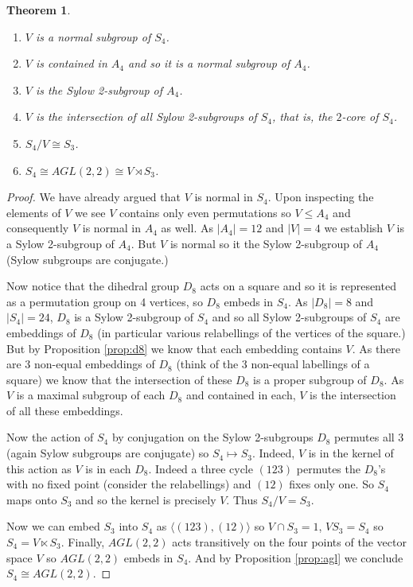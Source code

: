 \documentclass[12pt]{article}
\newtheorem{thm}{Theorem}
\providecommand{\intersect}{\cap}
\begin{document}
\begin{thm}
\begin{enumerate}
\item $V$ is a normal subgroup of $S_4$.
\item $V$ is contained in $A_4$ and so it is a normal subgroup of $A_4$.
\item $V$ is the Sylow 2-subgroup of $A_4$.
\item $V$ is the intersection of all Sylow 2-subgroups of $S_4$, that is,
the $2$-core of $S_4$.
\item $S_4/V\cong S_3$.
\item $S_4\cong AGL(2,2)\cong V\rtimes S_3$.
\end{enumerate}
\end{thm}
\begin{proof}
We have already argued that $V$ is normal in $S_4$.  Upon inspecting the
elements of $V$ we see $V$ contains only even permutations so $V\leq A_4$
and consequently $V$ is normal in $A_4$ as well.  As $|A_4|=12$ and $|V|=4$
we establish $V$ is a Sylow 2-subgroup of $A_4$.  But $V$ is normal so it
the Sylow 2-subgroup of $A_4$ (Sylow subgroups are conjugate.)  

Now notice that the dihedral group $D_8$ acts on a square and so it is
represented as a permutation group on 4 vertices, so $D_8$ embeds in $S_4$.
As $|D_8|=8$ and $|S_4|=24$, $D_8$ is a Sylow 2-subgroup of $S_4$ and so
all Sylow 2-subgroups of $S_4$ are embeddings of $D_8$ (in particular various
relabellings of the vertices of the square.)  But by Proposition \ref{prop:d8}
we know that each embedding contains $V$.  As there are 3 non-equal 
embeddings of $D_8$ (think of the 3 non-equal labellings of a square) we 
know that the intersection of these $D_8$ is a proper subgroup of $D_8$.
As $V$ is a maximal subgroup of each $D_8$ and contained in each, $V$ is
the intersection of all these embeddings.

Now the action of $S_4$ by conjugation on the Sylow 2-subgroups $D_8$
permutes all 3 (again Sylow subgroups are conjugate) so $S_4\mapsto S_3$.
Indeed, $V$ is in the kernel of this action as $V$ is in each $D_8$.
Indeed a three cycle $(123)$ permutes the $D_8$'s with no fixed point
(consider the relabellings) and $(12)$ fixes only one.  So $S_4$ maps 
onto $S_3$ and so the kernel is precisely $V$.  Thus $S_4/V=S_3$.

Now we can embed $S_3$ into $S_4$ as $\langle (123),(12)\rangle$ so 
$V\intersect S_3=1$, $VS_3=S_4$ so $S_4=V\ltimes S_3$.  Finally, $AGL(2,2)$
acts transitively on the four points of the vector space $V$ so 
$AGL(2,2)$ embeds in $S_4$.  And by Proposition \ref{prop:agl} we conclude
$S_4\cong AGL(2,2)$.
\end{proof}
\end{document}
